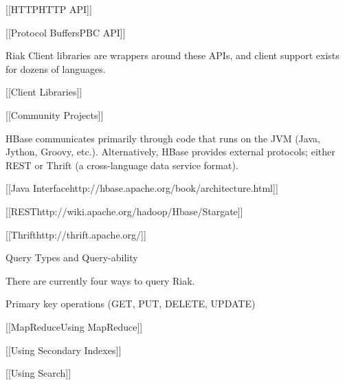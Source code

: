 \documentclass[letter]{book}
\begin{document}
{[}{[}HTTP\textbar{}HTTP API{]}{]}

{[}{[}Protocol Buffers\textbar{}PBC API{]}{]}

Riak Client libraries are wrappers around these APIs, and client support exists for dozens of languages.

{[}{[}Client Libraries{]}{]}

{[}{[}Community Projects{]}{]}

HBase communicates primarily through code that runs on the JVM (Java, Jython, Groovy, etc.). Alternatively, HBase provides external protocols; either REST or Thrift (a cross-language data service format).

{[}{[}Java Interface\textbar{}http://hbase.apache.org/book/architecture.html{]}{]}

{[}{[}REST\textbar{}http://wiki.apache.org/hadoop/Hbase/Stargate{]}{]}

{[}{[}Thrift\textbar{}http://thrift.apache.org/{]}{]}

Query Types and Query-ability

There are currently four ways to query Riak.

Primary key operations (GET, PUT, DELETE, UPDATE)

{[}{[}MapReduce\textbar{}Using MapReduce{]}{]}

{[}{[}Using Secondary Indexes{]}{]}

{[}{[}Using Search{]}{]}
\end{document}

